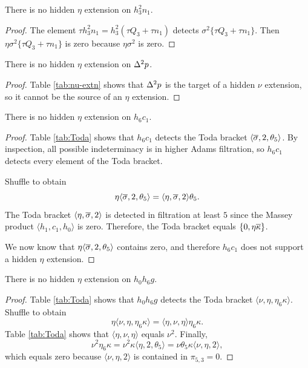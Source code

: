 \begin{lemma}
\label{lem:eta-h3^2n1}
There is no hidden $\eta$ extension on $h_3^2 n_1$.
\end{lemma}

\begin{proof}
The element $\tau h_3^2 n_1 = h_3^2 (\tau Q_3 + \tau n_1)$
detects $\sigma^2 \{\tau Q_3 + \tau n_1\}$.  Then
$\eta \sigma^2 \{\tau Q_3 + \tau n_1\}$ is zero because
$\eta \sigma^2$ is zero.
\end{proof}

\begin{lemma}
\label{lem:eta-D^2p}
There is no hidden $\eta$ extension on $\Delta^2 p$.
\end{lemma}

\begin{proof}
Table \ref{tab:nu-extn} shows that
$\Delta^2 p$ is the target of a hidden $\nu$ extension, so it cannot
be the source of an $\eta$ extension.
\end{proof}

\begin{lemma}
\label{lem:eta-h6c1}
There is no hidden $\eta$ extension on $h_6 c_1$.
\end{lemma}

\begin{proof}
Table \ref{tab:Toda} shows that $h_6 c_1$ detects the Toda
bracket $\langle \overline{\sigma}, 2, \theta_5 \rangle$.  By inspection,
all possible indeterminacy is in higher Adams filtration,
so $h_6 c_1$ detects every element of the Toda bracket.

Shuffle to obtain
\[
\eta \langle \overline{\sigma}, 2, \theta_5 \rangle =
\langle \eta, \overline{\sigma}, 2 \rangle \theta_5.
\]
The Toda bracket $\langle \eta, \overline{\sigma}, 2 \rangle$
is detected in filtration at least $5$ since
the Massey product $\langle h_1, c_1, h_0 \rangle$
is zero.
Therefore, the Toda bracket equals $\{0, \eta \overline{\kappa}\}$.

We now know that $\eta \langle \overline{\sigma}, 2, \theta_5 \rangle$
contains zero, and therefore $h_6 c_1$ does not support
a hidden $\eta$ extension.
\end{proof}

\begin{lemma}
\label{lem:eta-h0h6g}
There is no hidden $\eta$ extension on $h_0 h_6 g$.
\end{lemma}

\begin{proof}
Table \ref{tab:Toda} shows that $h_0 h_6 g$ detects the Toda bracket
$\langle \nu, \eta, \eta_6 \kappa \rangle$.
Shuffle to obtain
\[
\eta \langle \nu, \eta, \eta_6 \kappa \rangle =
\langle \eta, \nu, \eta \rangle \eta_6 \kappa.
\]
Table \ref{tab:Toda} shows that $\langle \eta, \nu, \eta \rangle$
equals $\nu^2$.
Finally, 
\[
\nu^2 \eta_6 \kappa = \nu^2 \kappa \langle \eta, 2, \theta_5 \rangle =
\nu \theta_5 \kappa \langle \nu, \eta, 2 \rangle,
\]
which equals zero because $\langle \nu, \eta, 2 \rangle$ is contained
in $\pi_{5,3} = 0$.
\end{proof}

